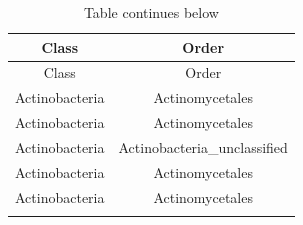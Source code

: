 \documentclass[]{article}
\begin{document}
\begin{longtable}[]{@{}cc@{}}
\caption{Table continues below}\tabularnewline
\toprule
\begin{minipage}[b]{0.38\columnwidth}\centering
Class\strut
\end{minipage} & \begin{minipage}[b]{0.39\columnwidth}\centering
Order\strut
\end{minipage}\tabularnewline
\midrule
\endfirsthead
\toprule
\begin{minipage}[b]{0.38\columnwidth}\centering
Class\strut
\end{minipage} & \begin{minipage}[b]{0.39\columnwidth}\centering
Order\strut
\end{minipage}\tabularnewline
\midrule
\endhead
\begin{minipage}[t]{0.38\columnwidth}\centering
Actinobacteria\strut
\end{minipage} & \begin{minipage}[t]{0.39\columnwidth}\centering
Actinomycetales\strut
\end{minipage}\tabularnewline
\begin{minipage}[t]{0.38\columnwidth}\centering
Actinobacteria\strut
\end{minipage} & \begin{minipage}[t]{0.39\columnwidth}\centering
Actinomycetales\strut
\end{minipage}\tabularnewline
\begin{minipage}[t]{0.38\columnwidth}\centering
Actinobacteria\strut
\end{minipage} & \begin{minipage}[t]{0.39\columnwidth}\centering
Actinobacteria\_unclassified\strut
\end{minipage}\tabularnewline
\begin{minipage}[t]{0.38\columnwidth}\centering
Actinobacteria\strut
\end{minipage} & \begin{minipage}[t]{0.39\columnwidth}\centering
Actinomycetales\strut
\end{minipage}\tabularnewline
\begin{minipage}[t]{0.38\columnwidth}\centering
Actinobacteria\strut
\end{minipage} & \begin{minipage}[t]{0.39\columnwidth}\centering
Actinomycetales\strut
\end{minipage}\tabularnewline
\begin{minipage}[t]{0.38\columnwidth}\centering

\end{minipage}
\end{longtable}
\end{document}
